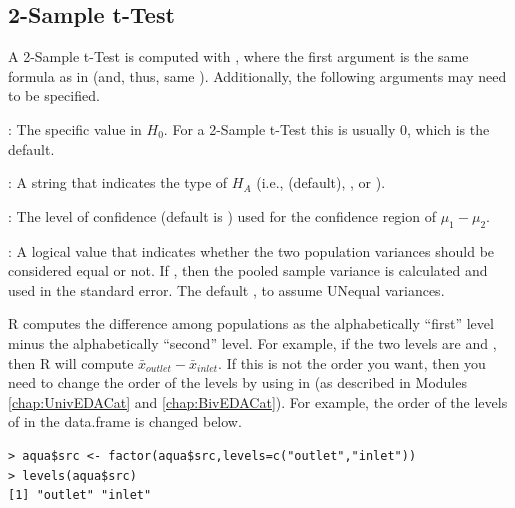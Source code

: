 \documentclass[10pt,openany]{book}\usepackage[]{graphicx}\usepackage[]{color}
\makeatletter
\newenvironment{kframe}{%
 \def\at@end@of@kframe{}%
 \ifinner\ifhmode%
  \def\at@end@of@kframe{\end{minipage}}%
  \begin{minipage}{\columnwidth}%
 \fi\fi%
 \def\FrameCommand##1{\hskip\@totalleftmargin \hskip-\fboxsep
 \colorbox{shadecolor}{##1}\hskip-\fboxsep
     \hskip-\linewidth \hskip-\@totalleftmargin \hskip\columnwidth}%
 \MakeFramed {\advance\hsize-\width
   \@totalleftmargin\z@ \linewidth\hsize
   \@setminipage}}%
 {\par\unskip\endMakeFramed%
 \at@end@of@kframe}
\newenvironment{knitrout}{}{} %
\makeatother
\begin{document}
\subsection{2-Sample t-Test}
\vspace*{-4pt}
A 2-Sample t-Test is computed with , where the first argument is the same formula as in  (and, thus, same ). Additionally, the following arguments may need to be specified.
\vspace*{-8pt}
\begin{Itemize}
  \item {}: The specific value in $H_{0}$. For a 2-Sample t-Test this is usually 0, which is the default.
  \item {}: A string that indicates the type of $H_{A}$ (i.e.,  (default), , or ).
  \item {}: The level of confidence (default is ) used for the confidence region of $\mu_{1}-\mu_{2}$.
  \item {}: A logical value that indicates whether the two population variances should be considered equal or not. If , then the pooled sample variance is calculated and used in the standard error. The default , to assume UNequal variances.
\end{Itemize}

\vspace*{-8pt}

R computes the difference among populations as the alphabetically ``first'' level minus the alphabetically ``second'' level. For example, if the two levels are  and , then R will compute $\bar{x}_{outlet}-\bar{x}_{inlet}$. If this is not the order you want, then you need to change the order of the levels by using  in  (as described in Modules \ref{chap:UnivEDACat} and \ref{chap:BivEDACat}). For example, the order of the levels of  in the  data.frame is changed below.
\begin{knitrout}
\color{fgcolor}\begin{kframe}
\begin{verbatim}
> aqua$src <- factor(aqua$src,levels=c("outlet","inlet"))
> levels(aqua$src)
[1] "outlet" "inlet" 
\end{verbatim}
\end{kframe}
\end{knitrout}
\end{document}
